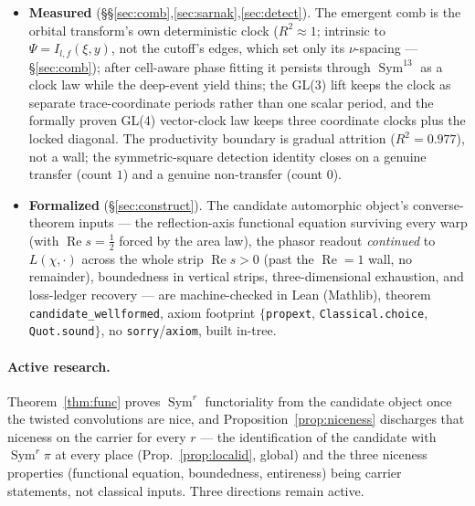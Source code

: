 \documentclass[11pt]{article}
\theoremstyle{definition}
\renewcommand{\Re}{\operatorname{Re}}
\newcommand{\Sym}{\operatorname{Sym}}
\begin{document}
\begin{itemize}
\item \textbf{Measured} (\S\S\ref{sec:comb},\ref{sec:sarnak},\ref{sec:detect}). The emergent comb is the orbital
transform's own deterministic clock ($R^2\approx1$; intrinsic to $\Psi=I_{l,f}(\xi,y)$, not the cutoff's edges,
which set only its $\nu$-spacing --- \S\ref{sec:comb}); after cell-aware phase fitting it persists through
$\Sym^{13}$ as a clock law while the deep-event yield thins; the GL(3) lift keeps the clock as separate
trace-coordinate periods rather than one scalar period, and the formally proven GL(4) vector-clock law keeps
three coordinate clocks plus the locked diagonal. The productivity boundary is gradual attrition
($R^2=0.977$), not a wall; the symmetric-square detection identity closes on a genuine transfer
(count $1$) and a genuine non-transfer (count $0$).

\item \textbf{Formalized} (\S\ref{sec:construct}). The candidate automorphic object's converse-theorem
inputs --- the reflection-axis functional equation surviving every warp (with $\Re s=\tfrac12$ forced
by the area law), the phasor readout \emph{continued} to $L(\chi,\cdot)$ across the whole strip
$\Re s>0$ (past the $\Re=1$ wall, no remainder), boundedness in vertical strips, three-dimensional
exhaustion, and loss-ledger recovery --- are machine-checked in Lean (Mathlib), theorem
\texttt{candidate\_wellformed}, axiom footprint $\{$\texttt{propext}, \texttt{Classical.choice},
\texttt{Quot.sound}$\}$, no \texttt{sorry}/\texttt{axiom}, built in-tree.
\end{itemize}

\paragraph{Active research.} Theorem~\ref{thm:func} proves $\Sym^r$ functoriality from the candidate
object once the twisted convolutions are nice, and Proposition~\ref{prop:niceness} discharges that
niceness on the carrier for every $r$ --- the identification of the candidate with $\Sym^r\pi$ at every
place (Prop.~\ref{prop:localid}, global) and the three niceness properties (functional equation,
boundedness, entireness) being carrier statements, not classical inputs. Three directions remain active.
\end{document}
